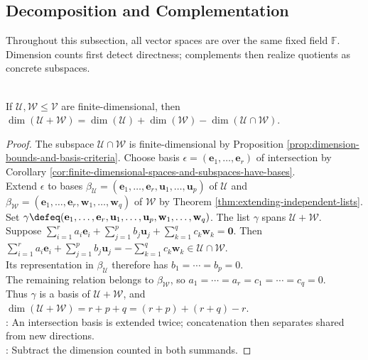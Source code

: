 \subsection{Decomposition and Complementation}
Throughout this subsection, all vector spaces are over the same fixed field $\mathbb{F}$. Dimension counts first detect directness; complements then realize quotients as concrete subspaces.

\begin{theorem} \label{thm:dimension-formula-for-sum} \\
If $\mathcal{U},\mathcal{W}\leq\mathcal{V}$ are finite-dimensional, then $\dim(\mathcal{U}+\mathcal{W})=\dim(\mathcal{U})+\dim(\mathcal{W})-\dim(\mathcal{U}\cap\mathcal{W})$.
\begin{proof}
The subspace $\mathcal{U}\cap\mathcal{W}$ is finite-dimensional by Proposition \ref{prop:dimension-bounds-and-basis-criteria}. Choose basis $\epsilon=(\mathbf{e}_1,\ldots,\mathbf{e}_r)$ of intersection by Corollary \ref{cor:finite-dimensional-spaces-and-subspaces-have-bases}.\\
Extend $\epsilon$ to bases $\beta_{\mathcal{U}}=(\mathbf{e}_1,\ldots,\mathbf{e}_r,\mathbf{u}_1,\ldots,\mathbf{u}_p)$ of $\mathcal{U}$ and $\beta_{\mathcal{W}}=(\mathbf{e}_1,\ldots,\mathbf{e}_r,\mathbf{w}_1,\ldots,\mathbf{w}_q)$ of $\mathcal{W}$ by Theorem \ref{thm:extending-independent-lists}.\\
Set $\gamma\defeq(\mathbf{e}_1,\ldots,\mathbf{e}_r,\mathbf{u}_1,\ldots,\mathbf{u}_p,\mathbf{w}_1,\ldots,\mathbf{w}_q)$. The list $\gamma$ spans $\mathcal{U}+\mathcal{W}$.\\
Suppose $\sum\limits_{i=1}^{r}a_i\mathbf{e}_i+\sum\limits_{j=1}^{p}b_j\mathbf{u}_j+\sum\limits_{k=1}^{q}c_k\mathbf{w}_k=\mathbf{0}$. Then $\sum\limits_{i=1}^{r}a_i\mathbf{e}_i+\sum\limits_{j=1}^{p}b_j\mathbf{u}_j=-\sum\limits_{k=1}^{q}c_k\mathbf{w}_k\in\mathcal{U}\cap\mathcal{W}$.\\
Its representation in $\beta_{\mathcal{U}}$ therefore has $b_1=\cdots=b_p=0$.\\
The remaining relation belongs to $\beta_{\mathcal{W}}$, so $a_1=\cdots=a_r=c_1=\cdots=c_q=0$.\\
Thus $\gamma$ is a basis of $\mathcal{U}+\mathcal{W}$, and $\dim(\mathcal{U}+\mathcal{W})=r+p+q=(r+p)+(r+q)-r$.\\
: An intersection basis is extended twice; concatenation then separates shared from new directions.\\
: Subtract the dimension counted in both summands.
\end{proof}
\end{theorem}

